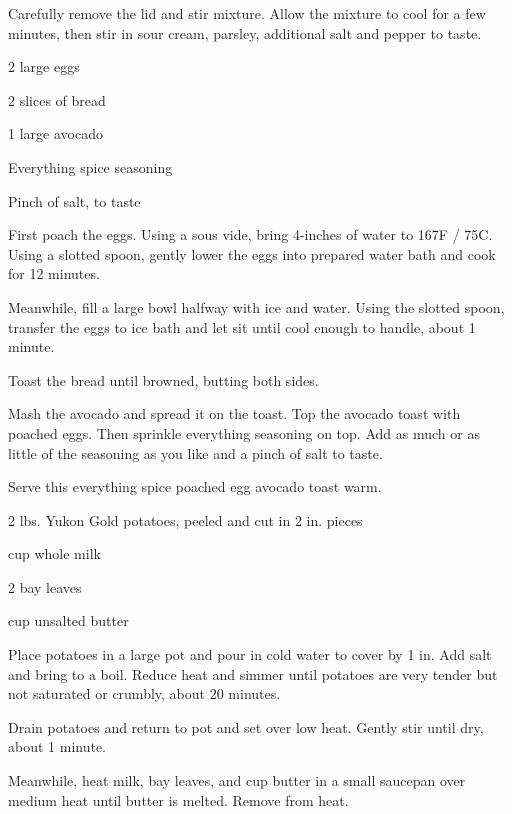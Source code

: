\documentclass{cookbook}
\begin{document}
Carefully remove the lid and stir mixture. Allow the mixture to cool for a few minutes, then stir in sour cream, parsley, additional salt and pepper to taste.


\begin{ingredients}
    \item 2 large eggs
    \item 2 slices of bread
    \item 1 large avocado
    \item Everything spice seasoning
    \item Pinch of salt, to taste
\end{ingredients}

First poach the eggs. Using a sous vide, bring 4-inches of water to 167\degree F / 75\degree C. Using a slotted spoon, gently lower the eggs into prepared water bath and cook for 12 minutes.

Meanwhile, fill a large bowl halfway with ice and water. Using the slotted spoon, transfer the eggs to ice bath and let sit until cool enough to handle, about 1 minute.

Toast the bread until browned, butting both sides.

Mash the avocado and spread it on the toast. Top the avocado toast with poached eggs. Then sprinkle everything seasoning on top. Add as much or as little of the seasoning as you like and a pinch of salt to taste.

Serve this everything spice poached egg avocado toast warm.


\begin{ingredients}
    \item 2 lbs. Yukon Gold potatoes, peeled and cut in 2 in. pieces
    \item {} cup whole milk
    \item 2 bay leaves
    \item {} cup unsalted butter
\end{ingredients}

Place potatoes in a large pot and pour in cold water to cover by 1 in. Add salt and bring to a boil. Reduce heat and simmer until potatoes are very tender but not saturated or crumbly, about 20 minutes.

Drain potatoes and return to pot and set over low heat. Gently stir until dry, about 1 minute.

Meanwhile, heat milk, bay leaves, and  cup butter in a small saucepan over medium heat until butter is melted. Remove from heat.
\end{document}
